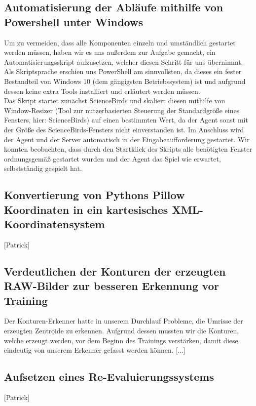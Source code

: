 \documentclass[11pt]{article}
\begin{document}
\subsection{Automatisierung der Abläufe mithilfe von Powershell unter Windows}
Um zu vermeiden, dass alle Komponenten einzeln und umständlich gestartet werden müssen, haben wir es uns außerdem zur Aufgabe gemacht, ein Automatisierungsskript aufzusetzen, welcher diesen Schritt für uns übernimmt. Als Skriptsprache erschien uns PowerShell am sinnvollsten, da dieses ein fester Bestandteil von Windows 10 (dem gängigsten Betriebssystem) ist und aufgrund dessen keine extra Tools installiert und erläutert werden müssen. \\Das Skript startet zunächst ScienceBirds und skaliert diesen mithilfe von Window-Resizer (Tool zur nutzerbasierten Steuerung der Standardgröße eines Fensters, hier: ScienceBirds) auf einen bestimmten Wert, da der Agent sonst mit der Größe des ScienceBirds-Fensters nicht einverstanden ist. Im Anschluss wird der Agent und der Server automatisch in der Eingabeaufforderung gestartet. Wir konnten beobachten, dass durch den Startklick des Skripts alle benötigten Fenster ordnungsgemäß gestartet wurden und der Agent das Spiel wie erwartet, selbstständig gespielt hat.
\subsection{Konvertierung von Pythons Pillow Koordinaten in ein kartesisches XML-Koordinatensystem}
[Patrick]
\subsection{Verdeutlichen der Konturen der erzeugten RAW-Bilder zur besseren Erkennung vor Training}
Der Konturen-Erkenner hatte in unserem Durchlauf Probleme, die Umrisse der erzeugten Zentroide zu erkennen. Aufgrund dessen mussten wir die Konturen, welche erzeugt werden, vor dem Beginn des Trainings verstärken, damit diese eindeutig von unserem Erkenner gefasst werden können. [...]
\subsection{Aufsetzen eines Re-Evaluierungssystems}
[Patrick]
\end{document}
